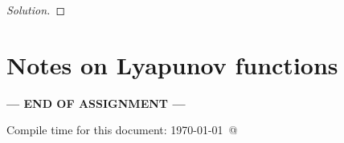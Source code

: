 \documentclass[12pt]{article}
\begin{document}
\begin{enumerate}[(a)]
{\begin{proof}[Solution]
	 
\end{proof}
}

\end{enumerate}

\newpage
\section*{Notes on Lyapunov functions}\hypertarget{NotesLyapFuns}{}

\NotesOnLyapunovFunctions




\bigskip

\centerline{\bf--- END OF ASSIGNMENT ---}

\bigskip
Compile time for this document:
\today\ @ \thistime
\end{document}

